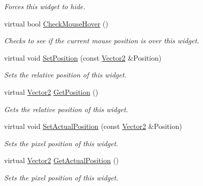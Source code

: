 \begin{DoxyCompactItemize}
\begin{DoxyCompactList}\small\item\em Forces this widget to hide. \item\end{DoxyCompactList}\item 
virtual bool \hyperlink{classphys_1_1UI_1_1DropDownList_a2ac515cb3282a0f190d002417e509424}{CheckMouseHover} ()
\begin{DoxyCompactList}\small\item\em Checks to see if the current mouse position is over this widget. \item\end{DoxyCompactList}\item 
virtual void \hyperlink{classphys_1_1UI_1_1DropDownList_a91dbfd382be8c505021739602a7a64e6}{SetPosition} (const \hyperlink{classphys_1_1Vector2}{Vector2} \&Position)
\begin{DoxyCompactList}\small\item\em Sets the relative position of this widget. \item\end{DoxyCompactList}\item 
virtual \hyperlink{classphys_1_1Vector2}{Vector2} \hyperlink{classphys_1_1UI_1_1DropDownList_a179dbf5e16fa6dd10ec8a72ae4349d3c}{GetPosition} ()
\begin{DoxyCompactList}\small\item\em Gets the relative position of this widget. \item\end{DoxyCompactList}\item 
virtual void \hyperlink{classphys_1_1UI_1_1DropDownList_af4d36a88b9629284d22d023bdcfd4074}{SetActualPosition} (const \hyperlink{classphys_1_1Vector2}{Vector2} \&Position)
\begin{DoxyCompactList}\small\item\em Sets the pixel position of this widget. \item\end{DoxyCompactList}\item 
virtual \hyperlink{classphys_1_1Vector2}{Vector2} \hyperlink{classphys_1_1UI_1_1DropDownList_a2c3b3dc073aebecd9216fa48e7cc10f2}{GetActualPosition} ()
\begin{DoxyCompactList}\small\item\em Sets the pixel position of this widget. \item\end{DoxyCompactList}\item 

\end{DoxyCompactItemize}
